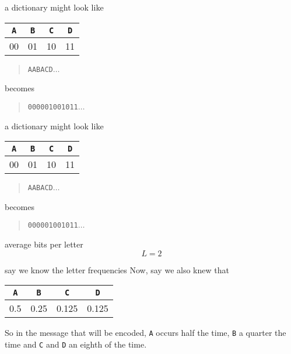 \documentclass{beamer}
\newcommand{\crish}{\color{reddish}}
\newcommand{\cbla}{\color{black}}
\newcommand{\cred}{\color{red}}
\newcommand{\cblu}{\color{blue}}
\newcommand{\cgre}{\color{green}}
\newcommand{\letter}[1]{\color{blue}\texttt{#1}\color{black}}
\newcommand{\binary}[1]{\color{red}\texttt{#1}\color{black}}
\begin{document}
\begin{frame}{a dictionary might look like}
\begin{center}
\begin{tabular}{cccc}
\letter{A}&\letter{B}&\letter{C}&\letter{D}\\
\hline\cred
00&\cred 01&\cred 10&\cred 11
\cbla\end{tabular}
\end{center}
  \begin{quote}
    \letter{AABAC\cgre D\cblu{}}$\ldots$
  \end{quote}
  becomes
    \begin{quote}
    \binary{0000010010\cgre 11\cred{}}$\ldots$
    \end{quote}
\end{frame}


\begin{frame}{a dictionary might look like}
\begin{center}
\begin{tabular}{cccc}
\letter{A}&\letter{B}&\letter{C}&\letter{D}\\
\hline\cred
00&\cred 01&\cred 10&\cred 11
\cbla\end{tabular}
\end{center}
  \begin{quote}
    \letter{AABACD}$\ldots$
  \end{quote}
  becomes
    \begin{quote}
    \binary{000001001011}$\ldots$
    \end{quote}
\end{frame}

\begin{frame}{average bits per letter}
  \crish
  $$
  L=2
  $$
  \cbla
\end{frame}


\begin{frame}{say we know the letter frequencies}
  Now, say we also knew that
  \begin{center}
\begin{tabular}{cccc}
\letter{A}&\letter{B}&\letter{C}&\letter{D}\\
\hline\cred
0.5&\cred 0.25&\cred 0.125&\cred 0.125
\cbla\end{tabular}
\end{center}
So in the message that will be encoded, \letter{A}{} occurs half the
time, \letter{B}{} a quarter the time and \letter{C}{} and \letter{D}{} an
eighth of the time.
\end{frame}
\end{document}
